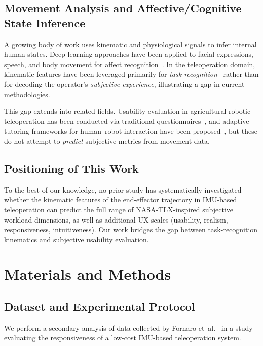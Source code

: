 \subsection{Movement Analysis and Affective/Cognitive State Inference}

A growing body of work uses kinematic and physiological signals to infer internal human states. Deep-learning approaches have been applied to facial expressions, speech, and body movement for affect recognition~\cite{rouast2021}. In the teleoperation domain, kinematic features have been leveraged primarily for \emph{task recognition}~\cite{stan2025} rather than for decoding the operator's \emph{subjective experience}, illustrating a gap in current methodologies.

This gap extends into related fields. Usability evaluation in agricultural robotic teleoperation has been conducted via traditional questionnaires~\cite{adamides2017}, and adaptive tutoring frameworks for human--robot interaction have been proposed~\cite{belgiovine2022}, but these do not attempt to \emph{predict} subjective metrics from movement data.

\subsection{Positioning of This Work}

To the best of our knowledge, no prior study has systematically investigated whether the kinematic features of the end-effector trajectory in IMU-based teleoperation can predict the full range of NASA-TLX-inspired subjective workload dimensions, as well as additional UX scales (usability, realism, responsiveness, intuitiveness). Our work bridges the gap between task-recognition kinematics and subjective usability evaluation.

\section{Materials and Methods}
\label{sec:methods}


\subsection{Dataset and Experimental Protocol}
\label{sec:dataset}

We perform a secondary analysis of data collected by Fornaro et~al.~\cite{fornaro2024} in a study evaluating the responsiveness of a low-cost IMU-based teleoperation system.


